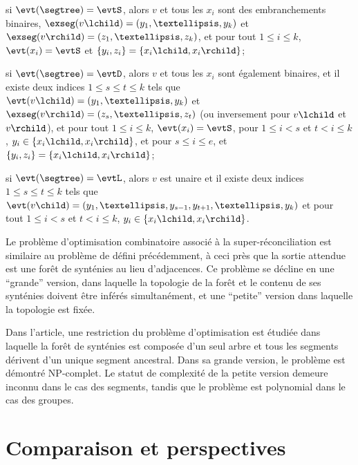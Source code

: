 \begin{compactitemize}
    \item si \(\evt(\segtree) = \evtS\), alors
        \(v\) et tous les \(x_i\) sont des embranchements binaires,
        \(\exseg(v\lchild) = (y_1, …, y_k)\) et \(\exseg(v\rchild) = (z_1, …, z_k)\),
        et pour tout \(1 \leq i \leq k\),
        \(\evt(x_i) = \evtS\)
        et \(\{y_i, z_i\} = \{x_i{}\lchild, x_i{}\rchild\}\);
    \item si \(\evt(\segtree) = \evtD\), alors
        \(v\) et tous les \(x_i\) sont également binaires,
        et il existe deux indices \(1 \leq s \leq t \leq k\) tels que
        \(\evt(v\lchild) = (y_1, …, y_k)\) et \(\exseg(v\rchild) = (z_s, …, z_t)\)
        (ou inversement pour \(v\lchild\) et \(v\rchild\)),
        et pour tout \(1 \leq i \leq k\),
        \(\evt(x_i) = \evtS\),
        pour \(1 \leq i < s\) et \(t < i \leq k\),
        \(y_i \in \{x_i{}\lchild, x_i{}\rchild\}\),
        et pour \(s \leq i \leq e\),
        et \(\{y_i, z_i\} = \{x_i{}\lchild, x_i{}\rchild\}\);
    \item si \(\evt(\segtree) = \evtL\), alors
        \(v\) est unaire et
        il existe deux indices \(1 \leq s \leq t \leq k\) tels que
        \(\evt(v\child) = (y_1, …, y_{s-1}, y_{t+1}, …, y_k)\)
        et pour tout \(1 \leq i < s\) et \(t < i \leq k\),
        \(y_i \in \{x_i{}\lchild, x_i{}\rchild\}\).
\end{compactitemize}

Le problème d’optimisation combinatoire associé à la super-réconciliation est similaire au problème de
défini précédemment, à ceci près que la sortie attendue est une forêt de synténies au lieu d’adjacences.
Ce problème se décline en une \enquote{grande} version, dans laquelle la topologie de la forêt et le contenu de ses synténies doivent être inférés simultanément, et une \enquote{petite} version dans laquelle la topologie est fixée.

Dans l’article, une restriction du problème d’optimisation est étudiée dans laquelle la forêt de synténies est composée d’un seul arbre et tous les segments dérivent d’un unique segment ancestral.
Dans sa grande version, le problème est démontré NP-complet.
Le statut de complexité de la petite version demeure inconnu dans le cas des segments, tandis que le problème est polynomial dans le cas des groupes.

\section{Comparaison et perspectives}

